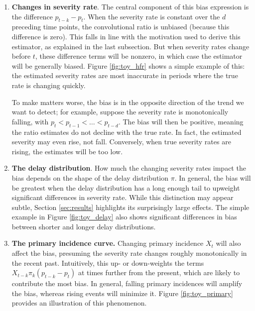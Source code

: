\documentclass{article}
\begin{document}
\begin{enumerate}
\item \textbf{Changes in severity rate}. The central component of this bias
  expression is the difference $p_{t-k}-p_t$. When the severity rate is constant
  over the $d$ preceding time points, the convolutional ratio is unbiased 
  (because this difference is zero). This falls in line with the motivation used
  to derive this estimator, as explained in the last subsection. But when 
  severity rates change before $t$, these difference terms will be nonzero, in
  which case the estimator will be generally biased. %
  Figure \ref{fig:toy_hfr} shows a simple example of this: the estimated
  severity rates are most inaccurate in periods where the true rate is changing
  quickly.        

  To make matters worse, the bias is in the opposite direction of the trend we 
  want to detect; for example, suppose the severity rate is monotonically
  falling, with $p_t < p_{t-1} < \dots < p_{t-d}$. The bias will then be
  positive, meaning the ratio estimates do not decline with the true rate. In
  fact, the estimated severity may even rise, not fall. Conversely, when true
  severity rates are rising, the estimates will be too low. 

\item \textbf{The delay distribution}. How much the changing severity rates
  impact the bias depends on the shape of the delay distribution $\pi$. In
  general, the bias will be greatest when the delay distribution has a long
  enough tail to upweight significant differences in severity rate. While this
  distinction may appear subtle, Section \ref{sec:results} highlights its
  surprisingly large effects. The simple example in Figure \ref{fig:toy_delay}
  also shows significant differences in bias between shorter and longer delay
  distributions.     

\item \textbf{The primary incidence curve.} Changing primary incidence $X_t$ 
  will also affect the bias, presuming the severity rate changes roughly 
  monotonically in the recent past. Intuitively, this up- or down-weights the
  terms $X_{t-k}\pi_k (p_{t-k} - p_t)$ at times further from the present, which  
  are likely to contribute the most bias. In general, falling primary incidences
  will amplify the bias, whereas rising events will minimize it. Figure
  \ref{fig:toy_primary} provides an illustration of this phenomenon.   
\end{enumerate}
\end{document}
